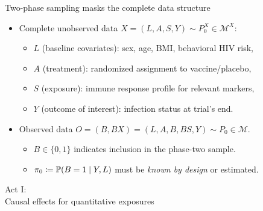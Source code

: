 \documentclass{beamer}
\begin{document}

\begin{frame}[c]{Two-phase sampling masks the complete data structure}

\begin{center}
\begin{itemize}
  \itemsep8pt
  \item Complete unobserved data $X = (L, A, S, Y) \sim P_0^X \in
    \mathcal{M}^X$:
    \begin{itemize}
      \itemsep4pt
      \item $L$ (baseline covariates): sex, age, BMI, behavioral HIV risk,
      \item $A$ (treatment): randomized assignment to vaccine/placebo,
      \item $S$ (exposure): immune response profile for relevant markers,
      \item $Y$ (outcome of interest): infection status at trial's end.
    \end{itemize}
  \item Observed data $O = (B, BX) = (L, A, B, BS, Y) \sim P_0 \in \mathcal{M}$.
    \begin{itemize}
      \itemsep4pt
      \item $B \in \{0,1\}$ indicates inclusion in the phase-two sample.
      \item $\pi_0 \coloneqq \mathbb{P}(B = 1 \mid Y, L)$ must be \textit{known by
        design} or estimated.
    \end{itemize}
\end{itemize}
\end{center}


\end{frame}


\begin{frame}[standout]
  Act I:\\Causal effects for quantitative exposures
\end{frame}
\end{document}
